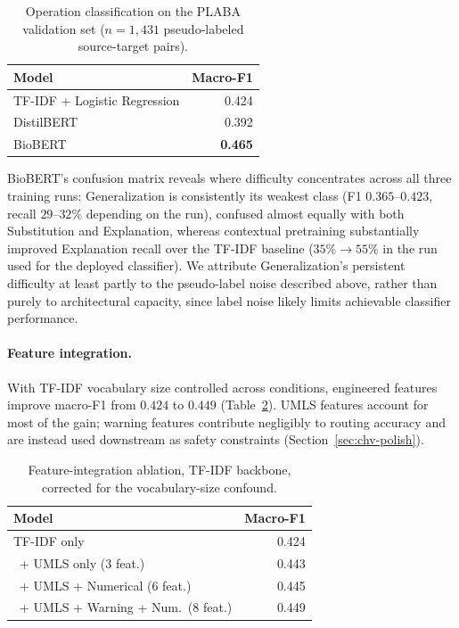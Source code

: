 \documentclass[11pt]{article}
\begin{document}
\begin{table}[t]
\centering
\small
\begin{tabular}{lr}
\toprule
\textbf{Model} & \textbf{Macro-F1} \\
\midrule
TF-IDF + Logistic Regression & 0.424 \\
DistilBERT                   & 0.392 \\
BioBERT                      & \textbf{0.465} \\
\bottomrule
\end{tabular}
\caption{Operation classification on the PLABA validation set ($n=1{,}431$
pseudo-labeled source-target pairs).}
\label{tab:classifier-progression}
\end{table}

BioBERT's confusion matrix reveals where difficulty concentrates across all
three training runs: Generalization is consistently its weakest class (F1
$0.365$--$0.423$, recall $29$--$32\%$ depending on the run), confused almost
equally with both Substitution and Explanation, whereas contextual
pretraining substantially improved Explanation recall over the TF-IDF
baseline ($35\% \rightarrow 55\%$ in the run used for the deployed
classifier). We attribute Generalization's persistent difficulty at least
partly to the pseudo-label noise described above, rather than purely to
architectural capacity, since label noise likely limits achievable
classifier performance.

\paragraph{Feature integration.}
\label{sec:feature-ablation}
With TF-IDF vocabulary size controlled across conditions, engineered
features improve macro-F1 from $0.424$ to $0.449$
(Table~\ref{tab:feature-ablation}). UMLS features account for most of the
gain; warning features contribute negligibly to routing accuracy and are
instead used downstream as safety constraints
(Section~\ref{sec:chv-polish}).

\begin{table}[t]
\centering
\small
\begin{tabular}{lr}
\toprule
\textbf{Model} & \textbf{Macro-F1} \\
\midrule
TF-IDF only                        & 0.424 \\
\ + UMLS only (3 feat.)             & 0.443 \\
\ + UMLS + Numerical (6 feat.)      & 0.445 \\
\ + UMLS + Warning + Num.\ (8 feat.) & 0.449 \\
\bottomrule
\end{tabular}
\caption{Feature-integration ablation, TF-IDF backbone, corrected for the
vocabulary-size confound.}
\label{tab:feature-ablation}
\end{table}
\end{document}
